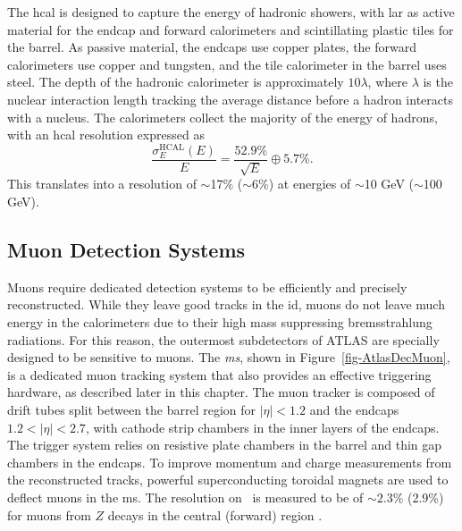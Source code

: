 The \gls{hcal} is designed to capture the energy of hadronic showers, with \gls{lar} as active material for the endcap and forward calorimeters and scintillating plastic tiles for the barrel. As passive material, the endcaps use copper plates, the forward calorimeters use copper and tungsten, and the tile calorimeter in the barrel uses steel. The depth of the hadronic calorimeter is approximately $10 \lambda$, where $\lambda$ is the nuclear interaction length tracking the average distance before a hadron interacts with a nucleus. The calorimeters collect the majority of the energy of hadrons, with an \gls{hcal} resolution expressed as \cite{Cavallari_2011}
\begin{equation}
  \frac{\sigma_E^{\text{HCAL}}(E)}{E} = \frac{52.9\%}{\sqrt{E}} \oplus 5.7\%.
\end{equation}
This translates into a resolution of $\sim$17\% ($\sim$6\%) at energies of $\sim$10 GeV ($\sim$100 GeV).

\subsection{Muon Detection Systems}
Muons require dedicated detection systems to be efficiently and precisely reconstructed. While they leave good tracks in the \gls{id}, muons do not leave much energy in the calorimeters due to their high mass suppressing bremsstrahlung radiations. For this reason, the outermost subdetectors of ATLAS are specially designed to be sensitive to muons. The \textit{\gls{ms}}, shown in Figure~\ref{fig-AtlasDecMuon}, is a dedicated muon tracking system that also provides an effective triggering hardware, as described later in this chapter. The muon tracker is composed of drift tubes split between the barrel region for $|\eta| < 1.2$ and the endcaps $1.2 < |\eta| < 2.7$, with cathode strip chambers in the inner layers of the endcaps. The trigger system relies on resistive plate chambers in the barrel and thin gap chambers in the endcaps. To improve momentum and charge measurements from the reconstructed tracks, powerful superconducting toroidal magnets are used to deflect muons in the \gls{ms}. The resolution on \pt\ is measured to be of $\sim 2.3$\% (2.9\%) for muons from $Z$ decays in the central (forward) region \cite{atlasMuonPTReco}.

